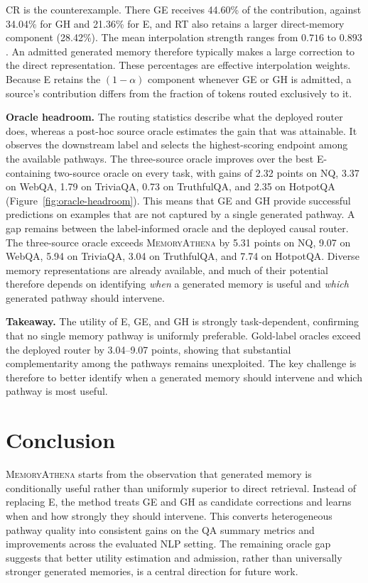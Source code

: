 \documentclass{article}
\newcommand{\takeaway}[1]{%
  \par\smallskip\noindent\begingroup
  \setlength{\fboxsep}{6pt}%
  \colorbox{harmonyblue!55}{\parbox{\dimexpr\linewidth-2\fboxsep\relax}{\textbf{Takeaway.} #1}}%
  \endgroup\par\smallskip}
\begin{document}
CR is the counterexample. There GE receives 44.60\% of the contribution,
against 34.04\% for GH and 21.36\% for E, and RT also retains a larger
direct-memory component (28.42\%). The mean interpolation strength ranges from $0.716$ to $0.893$. An admitted
generated memory therefore typically makes a large correction to the direct
representation.
These percentages are effective interpolation weights. Because E retains the
$(1-\alpha)$ component whenever GE or GH is admitted, a source's contribution
differs from the fraction of tokens routed exclusively to it.

\textbf{Oracle headroom.}
The routing statistics describe what the deployed router does, whereas a
post-hoc source oracle estimates the gain that was attainable. It observes the downstream label
and selects the highest-scoring endpoint among the available pathways.
%
The three-source oracle improves over the best E-containing two-source oracle
on every task, with gains of 2.32 points on NQ, 3.37 on WebQA, 1.79 on
TriviaQA, 0.73 on TruthfulQA, and 2.35 on HotpotQA
(Figure~\ref{fig:oracle-headroom}). This means that GE and GH provide successful
predictions on examples that are not captured by a single generated pathway.
%
A gap remains between the label-informed oracle and the deployed causal
router. The three-source oracle exceeds
\textsc{MemoryAthena} by 5.31 points on NQ, 9.07 on WebQA, 5.94 on TriviaQA,
3.04 on TruthfulQA, and 7.74 on HotpotQA. Diverse memory representations are already available, and much of their
potential therefore depends on identifying \emph{when} a generated memory is
useful and \emph{which} generated pathway should intervene.

\takeaway{
The utility of E, GE, and GH is strongly task-dependent, confirming that no
single memory pathway is uniformly preferable. Gold-label oracles exceed the
deployed router by 3.04--9.07 points, showing that substantial complementarity
among the pathways remains unexploited. The key challenge is therefore to
better identify when a generated memory should intervene and which pathway is
most useful.
}
\section{Conclusion}

\textsc{MemoryAthena} starts from the observation that generated memory is
conditionally useful rather than uniformly superior to direct retrieval.
Instead of replacing E, the method treats GE and GH as candidate corrections
and learns when and how strongly they should intervene. This converts
heterogeneous pathway quality into consistent gains on the QA summary metrics
and improvements across the evaluated NLP setting. The remaining oracle gap
suggests that better utility estimation and admission, rather than universally
stronger generated memories, is a central direction for future work.
\end{document}
